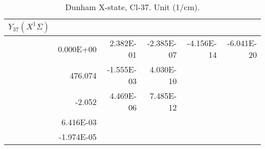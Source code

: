 \begin{table}
\begin{tabular}{crrrrr}
\toprule
$Y_{37} (X^1\Sigma)$\\ \midrule 
& 0.000E+00 & 2.382E-01 & -2.385E-07 & -4.156E-14 & -6.041E-20 \\
& 476.074 & -1.555E-03 & 4.030E-10 \\
& -2.052 & 4.469E-06 & 7.485E-12 \\
& 6.416E-03 \\
& -1.974E-05 \\
\bottomrule
\end{tabular}\caption{Dunham X-state, Cl-37. Unit (1/cm).}\end{table}
